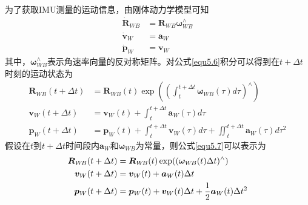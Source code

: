 为了获取IMU测量的运动信息，由刚体动力学模型可知
\begin{equation}
\label{equ5.6}
\begin{aligned}
\dot{\boldsymbol{R}}_{W\!B} &= \boldsymbol{R}_{W\!B}{\boldsymbol{\omega}}_{W\!B}^{\wedge}\\
\dot{\boldsymbol{v}}_W &= \boldsymbol{a}_W \\
\dot{\boldsymbol{p}}_W &= \boldsymbol{v}_W
\end{aligned}
\end{equation}
其中，${\boldsymbol{\omega}}_{W\!B}^{\wedge}$表示角速率向量的反对称矩阵。对公式\eqref{equ5.6}积分可以得到在$t+\Delta t$时刻的运动状态为
\begin{equation}
\label{equ5.7}
\begin{aligned}
\boldsymbol{R}_{W\!B}(t+\Delta t) &= \boldsymbol{R}_{W\!B}(t)\exp\left( { \left( \int_t^{t+\Delta t} \! \boldsymbol{\omega}_{W\!B}(\tau) d\tau \right)^{\wedge} } \right) \\
\boldsymbol{v}_W(t+\Delta t) &= \boldsymbol{v}_W(t) + \int_t^{t+\Delta t} \! \boldsymbol{a}_W(\tau) d\tau 
\\
\boldsymbol{p}_W(t+\Delta t) &= \boldsymbol{p}_W(t) + \int_t^{t+\Delta t} \! \boldsymbol{v}_W(\tau) d\tau + \iint_t^{t+\Delta t} \! \boldsymbol{a}_W(\tau)d\tau ^2
\end{aligned}
\end{equation}
假设在$t$到$t+\Delta t$时间段内$\boldsymbol{a}_W$和$\boldsymbol{\omega}_{W\!B}$为常量，则公式\eqref{equ5.7}可以表示为
\begin{equation}
\label{equ5.8}
\begin{aligned}
\boldsymbol{R}_{W\!B}(t+\Delta t) &= \boldsymbol{R}_{W\!B}(t) \exp(( \boldsymbol{\omega}_{W\!B}(t)\Delta t )^{\wedge}) \\
\boldsymbol{v}_W(t+\Delta t) &= \boldsymbol{v}_W(t)+\boldsymbol{a}_W(t)\Delta t \\
\boldsymbol{p}_W(t+\Delta t) &= \boldsymbol{p}_W(t)+\boldsymbol{v}_W(t)\Delta t + {1 \over 2} \boldsymbol{a}_W(t)\Delta t^2
\end{aligned}
\end{equation}

